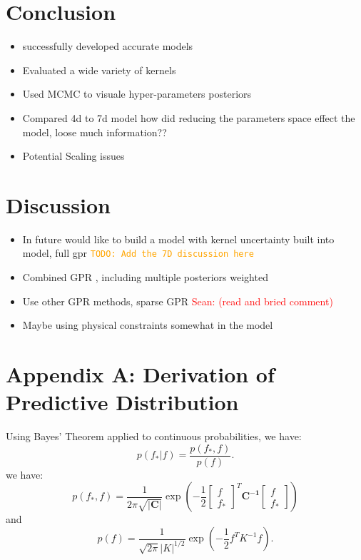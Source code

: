 \documentclass[12pt]{article}
\newcommand{\Sean}[1]{{\textcolor{red}{{Sean: #1}} }}
\newcommand{\todo}[1]{\textcolor{orange}{\texttt{TODO: #1}}}
\begin{document}
\section{Conclusion}
\begin{itemize}
    \item successfully developed accurate models
    \item Evaluated a wide variety of kernels
    \item Used MCMC to visuale hyper-parameters posteriors
    \item Compared 4d to 7d model how did reducing the parameters space effect the model, loose much information??
    \item Potential Scaling issues
\end{itemize}


\section{Discussion}
\begin{itemize}
    \item In future would like to build a model with kernel uncertainty built into model, full gpr
    \todo{Add the 7D discussion here}
    \item Combined GPR , including multiple posteriors weighted
    \item Use other GPR methods, sparse GPR \Sean{(read and bried comment)}
    \item Maybe using physical constraints somewhat in the model
\end{itemize}

\appendix

\section{Appendix A: Derivation of Predictive Distribution}
\label{appendix:A}
Using Bayes' Theorem applied to continuous probabilities, we have:
\[
p(f_* | f) = \frac{p(f_*, f)}{p(f)}.
\]
we have:
$$p(f_*,f) = \frac{1}{2\pi\sqrt{\mathbf{|C|}}}\exp \left(-\frac{1}{2} 
\begin{bmatrix} f \\ f_*  \end{bmatrix}^T\mathbf{C^{-1}}\begin{bmatrix} f  \\ f_* \end{bmatrix}\right)$$
and 
\[
p(f) = \frac{1}{\sqrt{2\pi} |K|^{1/2}}
\exp \left(-\frac{1}{2} f^T K^{-1} f \right).
\]
\end{document}
